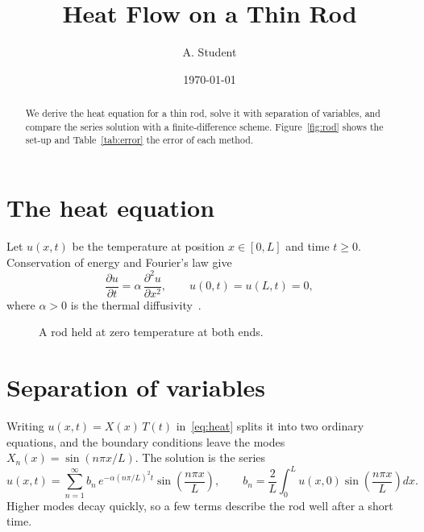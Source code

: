 \documentclass[11pt]{article}
\title{Heat Flow on a Thin Rod}
\author{A. Student}
\date{\today}
\begin{document}
\maketitle

\begin{abstract}
We derive the heat equation for a thin rod, solve it with separation of variables, and compare
the series solution with a finite-difference scheme. Figure~\ref{fig:rod} shows the set-up and
Table~\ref{tab:error} the error of each method.
\end{abstract}

\section{The heat equation}\label{sec:equation}
Let $u(x,t)$ be the temperature at position $x \in [0, L]$ and time $t \ge 0$. Conservation of
energy and Fourier's law give
\begin{equation}
  \frac{\partial u}{\partial t} = \alpha \, \frac{\partial^2 u}{\partial x^2},
  \qquad u(0,t) = u(L,t) = 0,
  \label{eq:heat}
\end{equation}
where $\alpha > 0$ is the thermal diffusivity~\cite{fourier1822,carslaw1959}.

\begin{figure}[ht]
  \centering
  \caption{A rod held at zero temperature at both ends.}
  \label{fig:rod}
\end{figure}

\section{Separation of variables}\label{sec:series}
Writing $u(x,t) = X(x)\,T(t)$ in~\eqref{eq:heat} splits it into two ordinary equations, and the
boundary conditions leave the modes $X_n(x) = \sin(n\pi x / L)$. The solution is the series
\begin{equation}
  u(x,t) = \sum_{n=1}^{\infty} b_n \, e^{-\alpha (n\pi/L)^2 t} \sin\!\left(\frac{n\pi x}{L}\right),
  \qquad b_n = \frac{2}{L}\int_0^L u(x,0) \sin\!\left(\frac{n\pi x}{L}\right) dx .
  \label{eq:series}
\end{equation}
Higher modes decay quickly, so a few terms describe the rod well after a short time.
\end{document}

